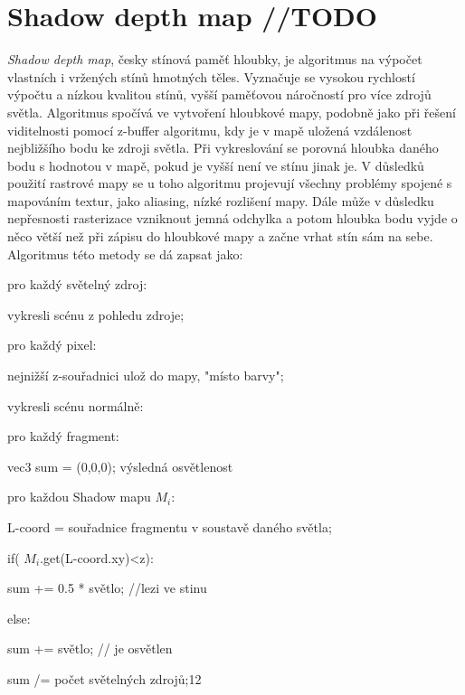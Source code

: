 \section{Shadow depth map //TODO}\label{shadowMap}
\emph{Shadow depth map}, česky stínová paměť hloubky\cite{MPGBook}, je algoritmus na výpočet vlastních i vržených stínů hmotných těles. Vyznačuje se vysokou rychlostí výpočtu a nízkou kvalitou stínů, vyšší paměťovou náročností pro více zdrojů světla. Algoritmus spočívá ve vytvoření hloubkové mapy, podobně jako při řešení viditelnosti pomocí z-buffer algoritmu, kdy je v mapě uložená vzdálenost nejbližšího bodu ke zdroji světla. Při vykreslování se porovná hloubka daného bodu s hodnotou v mapě, pokud je vyšší není ve stínu jinak je. V důsledků použití rastrové mapy se u toho algoritmu projevují všechny problémy spojené s mapováním textur, jako aliasing, nízké rozlišení mapy. Dále může v důsledku nepřesnosti rasterizace vzniknout jemná odchylka a potom hloubka bodu vyjde o něco větší než při zápisu do hloubkové mapy a začne vrhat stín sám na sebe. Algoritmus této metody se dá zapsat jako:  
	\begin{myEnumerate}
		\item pro každý světelný zdroj:
		\begin{myEnumerate}
			\item vykresli scénu z pohledu zdroje;
			\item pro každý pixel:
			\begin{myEnumerate}
				\item nejnižší z-souřadnici  ulož do mapy, "místo barvy";
			\end{myEnumerate}
		\end{myEnumerate}
		\item vykresli scénu normálně:	
				\begin{myEnumerate}
					\item pro každý fragment:
					\begin{myEnumerate}
						\item vec3 sum = (0,0,0); výsledná osvětlenost
						\item pro každou Shadow mapu $M_i$:
						\begin{myEnumerate}
							\item L-coord = souřadnice fragmentu v soustavě daného světla;
							\item if( $M_i$.get(L-coord.xy)<z):
								\begin{myEnumerate}
									\item sum += 0.5 * světlo;	//lezi ve stinu
								\end{myEnumerate}
							\item else:
								\begin{myEnumerate}
									\item sum += světlo;	// je osvětlen			
								\end{myEnumerate}
						\end{myEnumerate}
						\item sum /= počet světelných zdrojů;12
					\end{myEnumerate}
				\end{myEnumerate}
		\end{myEnumerate}


